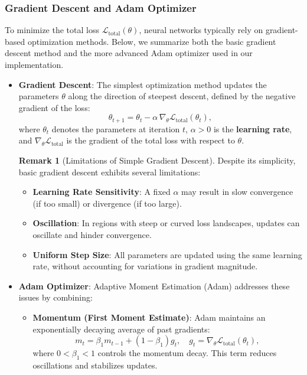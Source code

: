 \documentclass[12pt]{article}
\theoremstyle{definition}
\newtheorem{remark}{Remark}[subsection]
\begin{document}
\subsubsection{Gradient Descent and Adam Optimizer} \label{sec:adam_optimizer}

To minimize the total loss $\mathcal{L}_{\text{total}}(\theta)$, neural networks typically rely on gradient-based optimization methods. Below, we summarize both the basic gradient descent method and the more advanced Adam optimizer used in our implementation.

\begin{itemize}

    \item \textbf{Gradient Descent}: The simplest optimization method updates the parameters $\theta$ along the direction of steepest descent, defined by the negative gradient of the loss:
    \[
    \theta_{t+1} = \theta_t - \alpha \, \nabla_\theta \mathcal{L}_{\text{total}}(\theta_t),
    \]
    where $\theta_t$ denotes the parameters at iteration $t$, $\alpha > 0$ is the \textbf{learning rate}, and $\nabla_\theta \mathcal{L}_{\text{total}}$ is the gradient of the total loss with respect to $\theta$.

    \begin{remark}[Limitations of Simple Gradient Descent]
    Despite its simplicity, basic gradient descent exhibits several limitations:
    \begin{itemize}
        \item \textbf{Learning Rate Sensitivity}: A fixed $\alpha$ may result in slow convergence (if too small) or divergence (if too large).
        \item \textbf{Oscillation}: In regions with steep or curved loss landscapes, updates can oscillate and hinder convergence.
        \item \textbf{Uniform Step Size}: All parameters are updated using the same learning rate, without accounting for variations in gradient magnitude.
    \end{itemize}
    \end{remark}

    \item \textbf{Adam Optimizer}: Adaptive Moment Estimation (Adam) addresses these issues by combining:
    \begin{itemize}
        \item \textbf{Momentum (First Moment Estimate)}: Adam maintains an exponentially decaying average of past gradients:
        \[
        m_t = \beta_1 m_{t-1} + (1 - \beta_1) g_t, \quad g_t = \nabla_\theta \mathcal{L}_{\text{total}}(\theta_t),
        \]
        where $0 < \beta_1 < 1$ controls the momentum decay. This term reduces oscillations and stabilizes updates.


\end{itemize}
\end{itemize}
\end{document}
